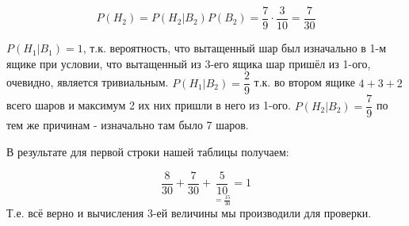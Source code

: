 \[ P(H_2) = P(H_2|B_2) P(B_2) = \frac{7}{9} \cdot \frac{3}{10} = \frac{7}{30} \]

\begin{remark}
	$P(H_1|B_1)=1$, т.к. вероятность, что вытащенный шар был изначально в 1-м ящике при условии, что вытащенный из 3-его ящика шар пришёл из 1-ого, очевидно, является тривиальным. $P(H_1|B_2)=\dfrac{2}{9}$ т.к.  во втором ящике $4+3+2$ всего шаров и максимум 2 их них пришли в него из 1-ого. $P(H_2|B_2)=\dfrac{7}{9}$ по тем же причинам - изначально там было 7 шаров.
\end{remark}

В результате для первой строки нашей таблицы получаем:

\[ \frac{8}{30} + \frac{7}{30} + \underset{=\frac{15}{30}}{\frac{5}{10}} = 1 \]
Т.е. всё верно и вычисления 3-ей величины мы производили для проверки. 

 